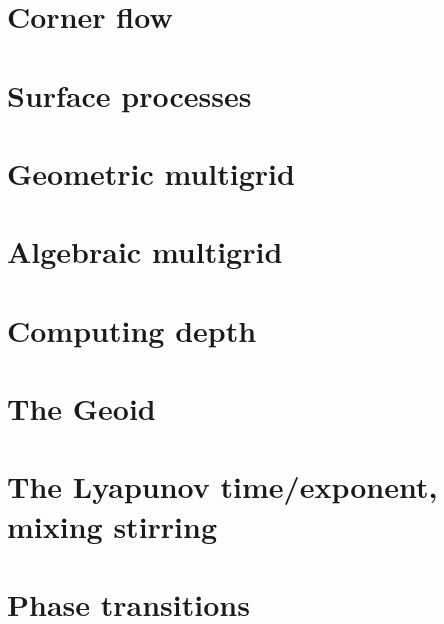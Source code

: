 \section{Corner flow} \label{sec:cornerflow}  %
\newpage %
\section{Surface processes \label{sec:surfaceprocesses}}  %
\newpage %
\section{Geometric multigrid}  %
\newpage %
\section{Algebraic multigrid}  %
\newpage %
\section{Computing depth \label{ss:depth}}  %
\newpage %
\section{The Geoid} \label{ss:geoid}  %
\newpage %
\section{The Lyapunov time/exponent, mixing stirring}\label{ss:lyapunov} %
\newpage %
\section{Phase transitions}\label{ss:phasetransitions} %
\newpage %
